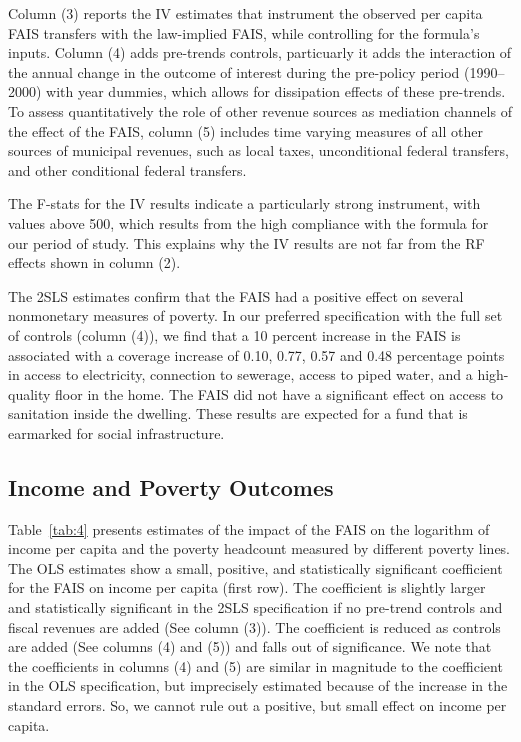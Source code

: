 \documentclass[dv_diss_main.tex]{subfiles}
\begin{document}
Column (3) reports the IV estimates that instrument the observed per capita FAIS transfers with the law-implied FAIS, while controlling for the formula's inputs. Column (4) adds pre-trends controls, particuarly it adds the interaction of the annual change in the outcome of interest during the pre-policy period (1990–2000) with year dummies, which allows for dissipation effects of these pre-trends. To assess quantitatively the role of other revenue sources as mediation channels of the effect of the FAIS, column (5) includes time varying measures of all other sources of municipal revenues, such as local taxes, unconditional federal transfers, and other conditional federal transfers.

The F-stats for the IV results indicate a particularly strong instrument, with values above 500, which results from the high compliance with the formula for our period of study. This explains why the IV results are not far from the RF effects shown in column (2).

The 2SLS estimates confirm that the FAIS had a positive effect on several nonmonetary measures of poverty. In our preferred specification with the full set of controls (column (4)), we find that a 10 percent increase in the FAIS is associated with a coverage increase of 0.10, 0.77, 0.57 and 0.48 percentage points in access to electricity, connection to sewerage, access to piped water, and a high-quality floor in the home. The FAIS did not have a significant effect on access to sanitation inside the dwelling. These results are expected for a fund that is earmarked for social infrastructure.



\subsection{Income and Poverty Outcomes}\label{subsec:income}

Table~\ref{tab:4} presents estimates of the impact of the FAIS on the logarithm of income per capita and the poverty headcount measured by different poverty lines. The OLS estimates show a small, positive, and statistically significant coefficient for the FAIS on income per capita (first row). The coefficient is slightly larger and statistically significant in the 2SLS specification if no pre-trend controls and fiscal revenues are added (See column (3)). The coefficient is reduced as controls are added (See columns (4) and (5)) and falls out of significance. We note that the coefficients in columns (4) and (5) are similar in magnitude to the coefficient in the OLS specification, but imprecisely estimated because of the increase in the standard errors. So, we cannot rule out a positive, but small effect on income per capita.
\end{document}
